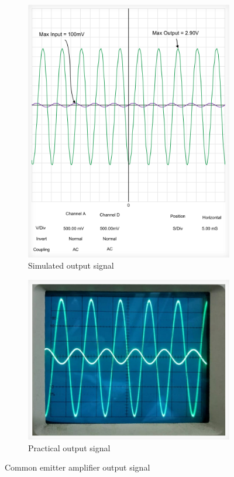 \documentclass[12pt]{article}
\begin{document}
\begin{figure}[h!]
    \centering
    \begin{subfigure}{0.45\textwidth}
        \includegraphics[width=\linewidth]{CE_sim.png}
        \caption{Simulated output signal}
        \label{fig:CE sim}
    \end{subfigure}
    \begin{subfigure}{0.45\textwidth}
        \includegraphics[width=\linewidth]{CE_prac.png}
        \caption{Practical output signal}
        \label{fig:CE prac}
    \end{subfigure}
    \caption{Common emitter amplifier output signal}
    \label{fig:CE signals}
\end{figure}
\end{document}
